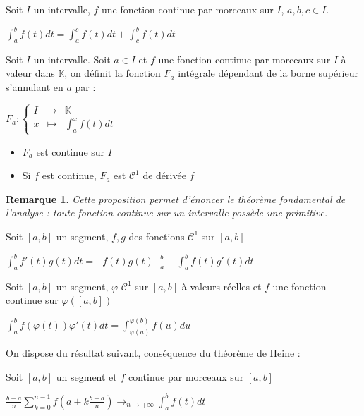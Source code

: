 \documentclass[a4paper,12pt]{book}
\newcommand{\Prop}[2]{\begin{tcolorbox}[sharp corners, colback=white,colframe=red!90!black!75, title=Proposition : #1]#2\end{tcolorbox}}
\newtheorem{Rem}{Remarque}[section]
\def\K{\mathbb{K}}
\begin{document}
\Prop{Chasles}{Soit $I$ un intervalle, $f$ une fonction continue par morceaux sur $I$, $a,b,c\in I$. \par\begin{center}$\int_a^bf(t)dt=\int_a^cf(t)dt+\int_c^bf(t)dt$\end{center}}
\Prop{}{Soit $I$ un intervalle. Soit $a\in I$ et $f$ une fonction continue par morceaux sur $I$ à valeur dans $\K$, on définit la fonction $F_a$ intégrale dépendant de la borne supérieur s'annulant en $a$ par : \par \begin{center}$F_a:\left\{\begin{array}{rcl} I & \to & \K \\ x & \mapsto & \int_a^xf(t)dt\end{array}\right.$\end{center} \begin{itemize}
\item $F_a$ est continue sur $I$
\item Si $f$ est continue, $F_a$ est $\mathcal{C}^1$ de dérivée $f$
\end{itemize}}
\begin{Rem}
Cette proposition permet d'énoncer le théorème fondamental de l'analyse : toute fonction continue sur un intervalle possède une primitive.
\end{Rem}
\Prop{Intégration par parties}{Soit $[a,b]$ un segment, $f,g$ des fonctions $\mathcal{C}^1$ sur $[a,b]$ \par\begin{center} $\int_a^bf'(t)g(t)dt = [f(t)g(t)]_a^b - \int_a^bf(t)g'(t)dt$\end{center}}
\Prop{Changement de variable}{Soit $[a,b]$ un segment, $\varphi$ $\mathcal{C}^1$ sur $[a,b]$ à valeurs réelles et $f$ une fonction continue sur $\varphi([a,b])$ \par \begin{center} $\int_a^bf(\varphi(t))\varphi'(t)dt = \int_{\varphi(a)}^{\varphi(b)} f(u)du$ \end{center}}
On dispose du résultat suivant, conséquence du théorème de Heine :
\Prop{Sommes de Riemann régulières}{Soit $[a,b]$ un segment et $f$ continue par morceaux sur $[a,b]$\par \begin{center}$\frac{b-a}{n}\sum\limits_{k=0}^{n-1}f\left(a+k\frac{b-a}{n}\right)\to_{n\to+\infty} \int_a^bf(t)dt$\end{center}}
\end{document}
